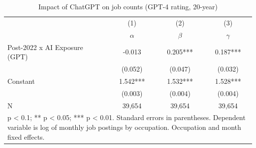 \begin{table}[h]\centering
\def\sym#1{\ifmmode^{#1}\else\(^{#1}\)\fi}
\caption{Impact of ChatGPT on job counts (GPT-4 rating, 20-year) \label{tab:did_postings_20yr_gpt}}
\begin{tabular}{l*{3}{c}}
\hline\hline
                    &\multicolumn{1}{c}{(1)}&\multicolumn{1}{c}{(2)}&\multicolumn{1}{c}{(3)}\\
                    &\multicolumn{1}{c}{$\alpha$}&\multicolumn{1}{c}{$\beta$}&\multicolumn{1}{c}{$\gamma$}\\
\hline
Post-2022 x AI Exposure (GPT)&      -0.013   &       0.205***&       0.187***\\
                    &     (0.052)   &     (0.047)   &     (0.032)   \\
Constant            &       1.542***&       1.532***&       1.528***\\
                    &     (0.003)   &     (0.004)   &     (0.004)   \\
\hline
N                   &      39,654   &      39,654   &      39,654   \\
\hline\hline
\multicolumn{4}{p{0.7\linewidth}}{\footnotesize * p < 0.1; ** p < 0.05; *** p < 0.01. Standard errors in parentheses. Dependent variable is log of monthly job postings by occupation. Occupation and month fixed effects.}\\
\end{tabular}
\end{table}
